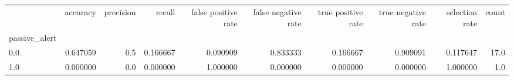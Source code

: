 \begin{tabular}{lrrrrrrrrr}
\toprule
{} &  accuracy &  precision &    recall &  false positive rate &  false negative rate &  true positive rate &  true negative rate &  selection rate &  count \\
passive\_alert &           &            &           &                      &                      &                     &                     &                 &        \\
\midrule
0.0           &  0.647059 &        0.5 &  0.166667 &             0.090909 &             0.833333 &            0.166667 &            0.909091 &        0.117647 &   17.0 \\
1.0           &  0.000000 &        0.0 &  0.000000 &             1.000000 &             0.000000 &            0.000000 &            0.000000 &        1.000000 &    1.0 \\
\bottomrule
\end{tabular}
